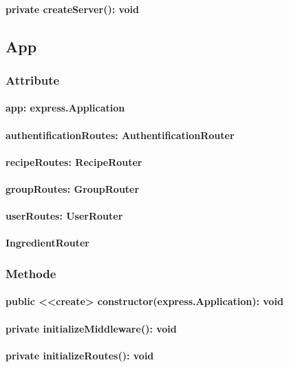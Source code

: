 \documentclass[parskip=full]{scrartcl}
\begin{document}
\paragraph{private createServer(): void}


\subsection{App}
\subsubsection*{Attribute}
\paragraph{app: express.Application}
\paragraph{authentificationRoutes: AuthentificationRouter}
\paragraph{recipeRoutes: RecipeRouter}
\paragraph{groupRoutes: GroupRouter}
\paragraph{userRoutes: UserRouter}
\paragraph{IngredientRouter}

\subsubsection*{Methode}
\paragraph{public <<create> constructor(express.Application): void}
\paragraph{private initializeMiddleware(): void}
\paragraph{private initializeRoutes(): void}
\end{document}
